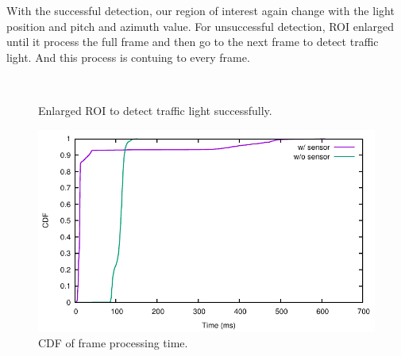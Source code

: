 With the successful detection, our region of interest again change with the light position and pitch and azimuth value.
For unsuccessful detection, ROI enlarged until it process the full frame and then go to the next frame to detect traffic light.
And this process is contuing to every frame.

\begin{figure}[!ht]
\centering
{}\\

\caption{Enlarged ROI to detect traffic light successfully.}
\label{f:rec_enl}
\end{figure}






\begin{figure}
\centering
\includegraphics[width=5.2in]{plots/cdf_time.pdf}
\caption{CDF of frame processing time.}
\label{f:cdf_time}
\end{figure}


